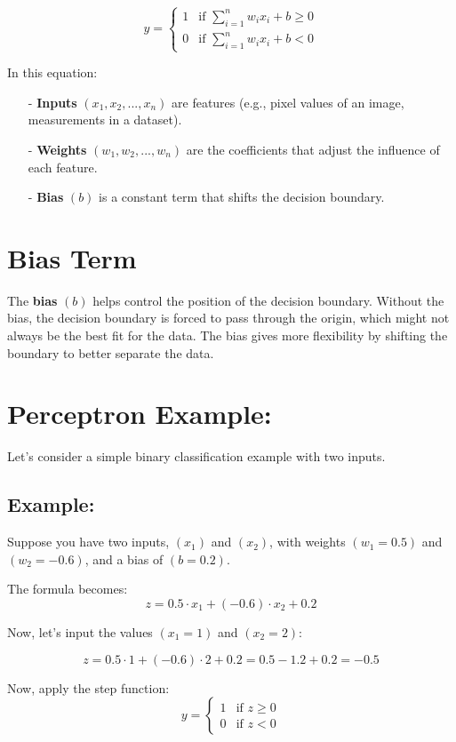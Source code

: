 \documentclass[10pt]{article}
\begin{document}
$$
y = 
\begin{cases}
1 & \text{if } \sum_{i=1}^{n} w_i x_i + b \geq 0 \\
0 & \text{if } \sum_{i=1}^{n} w_i x_i + b < 0
\end{cases}
$$

In this equation:
\begin{itemize}
   \item [-] {\bf Inputs} $(x_1, x_2, ..., x_n)$ are features (e.g., pixel values of an image, measurements in a dataset).
   \item [-] {\bf Weights} $(w_1, w_2, ..., w_n)$ are the coefficients that adjust the influence of each feature.
   \item [-] {\bf Bias} $(b)$ is a constant term that shifts the decision boundary.
\end{itemize}

\section{{\bf Bias Term}}
The {\bf bias} $(b)$ helps control the position of the decision boundary. Without the bias, the decision boundary is forced to pass through the origin, which might not always be the best fit for the data. The bias gives more flexibility by shifting the boundary to better separate the data.

\section{ Perceptron Example:}
Let's consider a simple binary classification example with two inputs.

\subsection{Example:}
Suppose you have two inputs, $(x_1)$ and $(x_2)$, with weights $(w_1 = 0.5)$ and $(w_2 = -0.6)$, and a bias of $(b = 0.2)$.

The formula becomes:
$$
z = 0.5 \cdot x_1 + (-0.6) \cdot x_2 + 0.2
$$

Now, let’s input the values $(x_1 = 1)$ and $(x_2 = 2)$:

$$
z = 0.5 \cdot 1 + (-0.6) \cdot 2 + 0.2 = 0.5 - 1.2 + 0.2 = -0.5
$$

Now, apply the step function:
$$
y = 
\begin{cases}
1 & \text{if } z \geq 0 \\
0 & \text{if } z < 0
\end{cases}
$$
\end{document}
